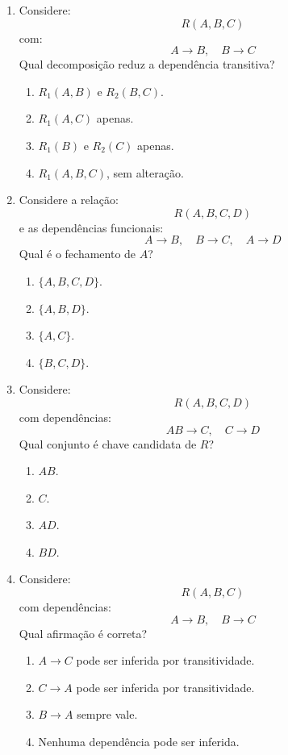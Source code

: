 \documentclass[12pt,a4paper]{article}
\begin{document}
\begin{enumerate}[resume,label=\textbf{Q\arabic*.}]
\begin{enumerate}[label=\alph*)]
    \item Apenas $A$.
    \item Apenas $B$.
    \item $A$ e $B$.
    \item Apenas $C$.
\end{enumerate}

\item Considere:
\[
R(A,B,C)
\]
com:
\[
A \rightarrow B,\quad B \rightarrow C
\]
Qual decomposição reduz a dependência transitiva?

\begin{enumerate}[label=\alph*)]
    \item $R_1(A,B)$ e $R_2(B,C)$.
    \item $R_1(A,C)$ apenas.
    \item $R_1(B)$ e $R_2(C)$ apenas.
    \item $R_1(A,B,C)$, sem alteração.
\end{enumerate}

\item Considere a relação:
\[
R(A,B,C,D)
\]
e as dependências funcionais:
\[
A \rightarrow B,\quad B \rightarrow C,\quad A \rightarrow D
\]
Qual é o fechamento de $A$?

\begin{enumerate}[label=\alph*)]
    \item $\{A,B,C,D\}$.
    \item $\{A,B,D\}$.
    \item $\{A,C\}$.
    \item $\{B,C,D\}$.
\end{enumerate}

\item Considere:
\[
R(A,B,C,D)
\]
com dependências:
\[
AB \rightarrow C,\quad C \rightarrow D
\]
Qual conjunto é chave candidata de $R$?

\begin{enumerate}[label=\alph*)]
    \item $AB$.
    \item $C$.
    \item $AD$.
    \item $BD$.
\end{enumerate}

\item Considere:
\[
R(A,B,C)
\]
com dependências:
\[
A \rightarrow B,\quad B \rightarrow C
\]
Qual afirmação é correta?

\begin{enumerate}[label=\alph*)]
    \item $A \rightarrow C$ pode ser inferida por transitividade.
    \item $C \rightarrow A$ pode ser inferida por transitividade.
    \item $B \rightarrow A$ sempre vale.
    \item Nenhuma dependência pode ser inferida.
\end{enumerate}


\end{enumerate}
\end{document}
